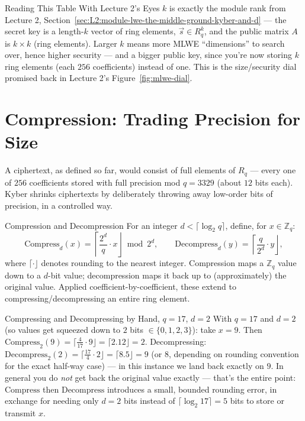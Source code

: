 \begin{rmkbox}{Reading This Table With Lecture 2's Eyes}
$k$ is exactly the module rank from Lecture 2, Section~\ref{sec:L2:module-lwe-the-middle-ground-kyber-and-d} --- the secret key is a length-$k$ vector of ring elements, $\vec s \in R_q^k$, and the public matrix $A$ is $k \times k$ (ring elements). Larger $k$ means more MLWE ``dimensions'' to search over, hence higher security --- and a bigger public key, since you're now storing $k$ ring elements (each $256$ coefficients) instead of one. This is the size/security dial promised back in Lecture 2's Figure~\ref{fig:mlwe-dial}.
\end{rmkbox}

\section{Compression: Trading Precision for Size}
\label{sec:L3:compression-trading-precision-for-size}

A ciphertext, as defined so far, would consist of full elements of $R_q$ --- every one of $256$ coefficients stored with full precision mod $q=3329$ (about $12$ bits each). Kyber shrinks ciphertexts by deliberately throwing away low-order bits of precision, in a controlled way.

\begin{defbox}{Compression and Decompression}
For an integer $d < \lceil \log_2 q \rceil$, define, for $x \in \mathbb{Z}_q$:
$$
\mathrm{Compress}_d(x) = \left\lceil \frac{2^d}{q}\cdot x \right\rfloor \bmod 2^d, \qquad
\mathrm{Decompress}_d(y) = \left\lceil \frac{q}{2^d}\cdot y \right\rfloor,
$$
where $\lceil \cdot \rfloor$ denotes rounding to the nearest integer. Compression maps a $\mathbb{Z}_q$ value down to a $d$-bit value; decompression maps it back up to (approximately) the original value. Applied coefficient-by-coefficient, these extend to compressing/decompressing an entire ring element.
\end{defbox}

\begin{exbox}{Compressing and Decompressing by Hand, $q=17$, $d=2$}
With $q=17$ and $d=2$ (so values get squeezed down to $2$ bits $\in\{0,1,2,3\}$): take $x=9$. Then $\mathrm{Compress}_2(9) = \lceil \frac{4}{17}\cdot 9 \rfloor = \lceil 2.12 \rfloor = 2$. Decompressing: $\mathrm{Decompress}_2(2) = \lceil \frac{17}{4}\cdot 2\rfloor = \lceil 8.5 \rfloor = 9$ (or $8$, depending on rounding convention for the exact half-way case) --- in this instance we land back exactly on $9$. In general you do \emph{not} get back the original value exactly --- that's the entire point: $\mathrm{Compress}$ then $\mathrm{Decompress}$ introduces a small, bounded rounding error, in exchange for needing only $d=2$ bits instead of $\lceil\log_2 17\rceil = 5$ bits to store or transmit $x$.
\end{exbox}

